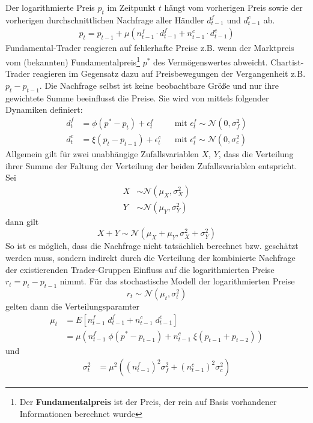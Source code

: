 \documentclass[ngerman]{ttlab-qualify}
\begin{document}
Der logarithmierte Preis $p_t$ im Zeitpunkt $t$ hängt vom vorherigen Preis sowie der vorherigen durchschnittlichen Nachfrage aller Händler $d_{t-1}^f$ und $d_{t-1}^c$ ab. 
\begin{align}
p_t = p_{t-1} + \mu (n_{t-1}^f\cdot d_{t-1}^f + n_{t-1}^c\cdot d_{t-1}^c)
\end{align}
Fundamental-Trader reagieren auf fehlerhafte Preise z.B. wenn der Marktpreis vom (bekannten) Fundamentalpreis\footnote{Der \textbf{Fundamentalpreis} ist der Preis, der rein auf Basis vorhandener Informationen berechnet wurde} $p^*$ des Vermögenswertes abweicht. Chartist-Trader reagieren im Gegensatz dazu auf Preisbewegungen der Vergangenheit z.B. $p_t-p_{t-1}$.
Die Nachfrage selbst ist keine beobachtbare Größe und nur ihre gewichtete Summe beeinflusst die Preise. Sie wird von \parencite{bertschinger:2018,FW:2011} mittels folgender Dynamiken definiert:
\begin{align}
d_t^f &= \phi (p^*-p_t)+\epsilon_t^f & &\text{mit }\epsilon_t^f\sim \mathcal{N}(0,\sigma^2_f)\nonumber \\
d_t^c &= \xi (p_t-p_{t-1})+\epsilon_t^c & &\text{mit }\epsilon_t^c\sim \mathcal{N}(0,\sigma^2_c)\nonumber 
\end{align}
Allgemein gilt für zwei unabhängige Zufallsvariablen $X$, $Y$, dass die Verteilung ihrer Summe der Faltung der Verteilung der beiden Zufallsvariablen entspricht.\\
Sei
\begin{align}
X&\sim \mathcal{N}(\mu_X, \sigma_X^2)\nonumber \\
Y&\sim \mathcal{N}(\mu_Y,\sigma_Y^2)\nonumber
\end{align}
dann gilt
\[X+Y\sim\mathcal{N}(\mu_X+\mu_Y,\sigma_X^2+\sigma_Y^2)\]
So ist es möglich, dass die Nachfrage nicht tatsächlich berechnet bzw. geschätzt werden muss, sondern indirekt durch die Verteilung der kombinierte Nachfrage der existierenden Trader-Gruppen Einfluss auf die logarithmierten Preise $r_t = p_t-p_{t-1}$ nimmt.
Für das stochastische Modell der logarithmierten Preise 
\[r_t\sim\mathcal{N}(\mu_t,\sigma_t^2)\]
gelten dann die Verteilungsparamter
\begin{align}
\mu_t&= E[n_{t-1}^f\; d_{t-1}^f + n_{t-1}^c\; d_{t-1}^c]\nonumber\\
&=\mu (n_{t-1}^f\; \phi(p^*-p_{t-1}) +n_{t-1}^c\; \xi (p_{t-1}+p_{t-2}))
\end{align}
und
\begin{align}
\label{eq:FW-vol}
\sigma_t^2 &= \mu^2((n_{t-1}^f)^2\sigma_f^2 + (n_{t-1}^c)^2\sigma_c^2)
\end{align}
\end{document}
